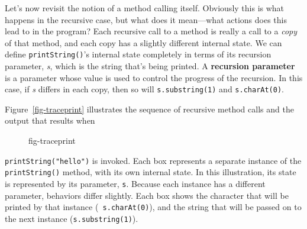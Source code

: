 
\noindent Let's now revisit the notion of a method
calling itself.  Obviously this is what happens in the recursive case,
but what does it mean---what actions does this lead to in the
program?  Each recursive call to a method is really a call to a {\it
copy} of that method, and each copy has a slightly different internal
state.  We can define {\tt printString()}'s internal state completely
in terms of its recursion parameter, {\it s}, which is the string that's being
printed.  A {\bf recursion parameter} is a parameter whose value is
used to control the progress of the recursion.   In this case, if
{\it s} differs in each copy, then so will {\tt s.substring(1)} and
{\tt s.charAt(0)}.


Figure~\ref{fig-traceprint} illustrates the sequence of recursive
method calls and the output that results when
\begin{figure}[htb]
{fig-traceprint}
\end{figure}
{\tt printString("hello")} is invoked.  Each box represents a separate
instance of the {\tt printString()} method, with its own internal
 state.  In this illustration, its
state is represented by its parameter, {\tt s}.  Because each instance
has a different parameter, behaviors differ slightly. Each box shows
the character that will be printed by that instance ({\tt
s.charAt(0)}), and the string that will be passed on to the next
instance ({\tt s.substring(1)}).



